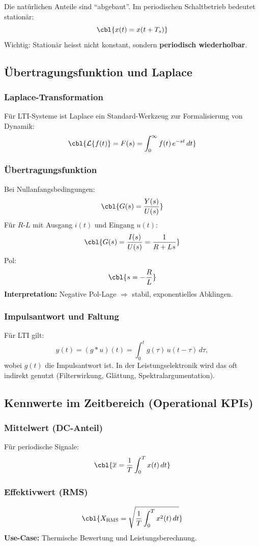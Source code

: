
Die natürlichen Anteile sind ``abgebaut''. Im periodischen Schaltbetrieb bedeutet stationär:
\[
\cbl{x(t)=x(t+T_s)}
\]
Wichtig: Stationär heisst nicht konstant, sondern \textbf{periodisch wiederholbar}.

\subsection{Übertragungsfunktion und Laplace }

\subsubsection{Laplace-Transformation}
Für LTI-Systeme ist Laplace ein Standard-Werkzeug zur Formalisierung von Dynamik:
\[
\cbl{\mathcal{L}\{f(t)\}=F(s)=\int_0^\infty f(t)\,e^{-st}\,dt}
\]

\subsubsection{Übertragungsfunktion}
Bei Nullanfangsbedingungen:
\[
\cbl{G(s)=\frac{Y(s)}{U(s)}}
\]
Für $R$-$L$ mit Ausgang $i(t)$ und Eingang $u(t)$:
\[
\cbl{G(s)=\frac{I(s)}{U(s)}=\frac{1}{R+Ls}}
\]
Pol:
\[
\cbl{s=-\frac{R}{L}}
\]
\textbf{Interpretation:} Negative Pol-Lage $\Rightarrow$ stabil, exponentielles Abklingen.

\subsubsection{Impulsantwort und Faltung}
Für LTI gilt:
\[
y(t)=(g*u)(t)=\int_{0}^{t} g(\tau)\,u(t-\tau)\,d\tau,
\]
wobei $g(t)$ die Impulsantwort ist.
In der Leistungselektronik wird das oft indirekt genutzt (Filterwirkung, Glättung, Spektralargumentation).

\subsection{Kennwerte im Zeitbereich (Operational KPIs)}

\subsubsection{Mittelwert (DC-Anteil)}
Für periodische Signale:
\[
\cbl{\overline{x}=\frac{1}{T}\int_{0}^{T} x(t)\,dt}
\]

\subsubsection{Effektivwert (RMS)}
\[
\cbl{X_{\mathrm{RMS}}=\sqrt{\frac{1}{T}\int_{0}^{T} x^2(t)\,dt}}
\]
\textbf{Use-Case:} Thermische Bewertung und Leistungsberechnung.

